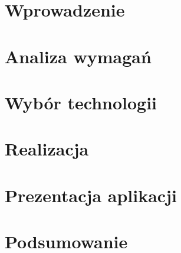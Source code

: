 \documentclass[12pt, a4paper]{report}
\begin{document}
\tableofcontents
\thispagestyle{empty}
\newpage
\setcounter{page}{1}


    \chapter{Wprowadzenie}\label{ch:wprowadzenie}
    


    \chapter{Analiza wymagań}\label{ch:analiza-wymagan}
    


    \chapter{Wybór technologii}\label{ch:wybor-technologii}
    


    \chapter{Realizacja}\label{ch:realizacja}
    


    \chapter{Prezentacja aplikacji}\label{ch:prezentacja-aplikacji}
    


    \chapter{Podsumowanie}\label{ch:podsumowanie}
    

    \newpage
    \renewcommand{\thepage}{}

    
    

    \thispagestyle{empty}
    \listoffigures
    \listoftables
    \lstlistoflistings
    \clearpage
\end{document}
